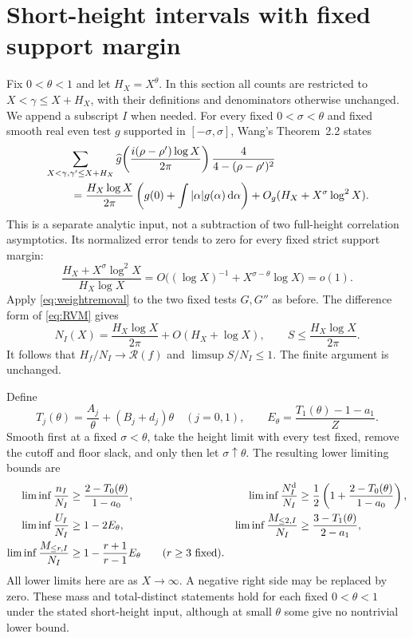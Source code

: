 \documentclass[11pt]{amsart}
\numberwithin{equation}{section}
\newcommand{\dd}{\,\mathrm d}
\newcommand{\Nd}{N^{\rm d}}
\begin{document}
\section{Short-height intervals with fixed support margin}
\label{sec:short}

Fix $0<\theta<1$ and let $H_X=X^\theta$. In this section all counts
are restricted to $X<\gamma\le X+H_X$, with their definitions
and denominators otherwise unchanged. We append a subscript $I$
when needed. For every fixed $0<\sigma<\theta$ and fixed smooth
real even test $g$ supported in $[-\sigma,\sigma]$, Wang's
Theorem~2.2 \cite{Wang} states
\begin{align}
 &\sum_{X<\gamma,\gamma'\le X+H_X}
 \widehat g\!\left(\frac{i(\rho-\rho')\log X}{2\pi}\right)
       \frac4{4-(\rho-\rho')^2}\notag\\
 &\hspace{8mm}=\frac{H_X\log X}{2\pi}
       \left(g(0)+\int|\alpha|g(\alpha)\dd\alpha\right)
                +O_g(H_X+X^\sigma\log^2X).
 \label{eq:Wang}
\end{align}
This is a separate analytic input, not a subtraction of two
full-height correlation asymptotics. Its normalized error tends
to zero for every fixed strict support margin:
\[
 \frac{H_X+X^\sigma\log^2X}{H_X\log X}
 =O\bigl((\log X)^{-1}+X^{\sigma-\theta}\log X\bigr)=o(1).
\]
Apply \eqref{eq:weightremoval} to the two fixed tests $G,G''$
as before. The difference form of \eqref{eq:RVM} gives
\[
 N_I(X)=\frac{H_X\log X}{2\pi}+O(H_X+\log X),
 \qquad S\le\frac{H_X\log X}{2\pi}.
\]
It follows that $H_f/N_I\to\mathcal R(f)$ and
$\limsup S/N_I\le1$. The finite argument is unchanged.

Define
\begin{equation}
 T_j(\theta)=\frac{A_j}{\theta}+(B_j+d_j)\theta\quad(j=0,1),
 \qquad E_\theta=\frac{T_1(\theta)-1-a_1}{Z}.
 \label{eq:shortconstants}
\end{equation}
Smooth first at a fixed $\sigma<\theta$, take the height limit
with every test fixed, remove the cutoff and floor slack, and only
then let $\sigma\uparrow\theta$. The resulting lower limiting
bounds are
\begin{align}
 \liminf\frac{n_I}{N_I}&\ge\frac{2-T_0(\theta)}{1-a_0},&
 \liminf\frac{\Nd_I}{N_I}&\ge
       \frac12\left(1+\frac{2-T_0(\theta)}{1-a_0}\right),
 \label{eq:shortintersection}\\
 \liminf\frac{U_I}{N_I}&\ge1-2E_\theta,&
 \liminf\frac{M_{\le2,I}}{N_I}&\ge\frac{3-T_1(\theta)}{2-a_1},
 \label{eq:shortunion}\\
 \liminf\frac{M_{\le r,I}}{N_I}&\ge
       1-\frac{r+1}{r-1}E_\theta\qquad(r\ge3\text{ fixed}).
 \label{eq:shorthigher}
\end{align}
All lower limits here are as $X\to\infty$. A negative right side
may be replaced by zero. These mass and total-distinct statements
hold for each fixed $0<\theta<1$ under the stated short-height
input, although at small $\theta$ some give no nontrivial lower
bound.
\end{document}
